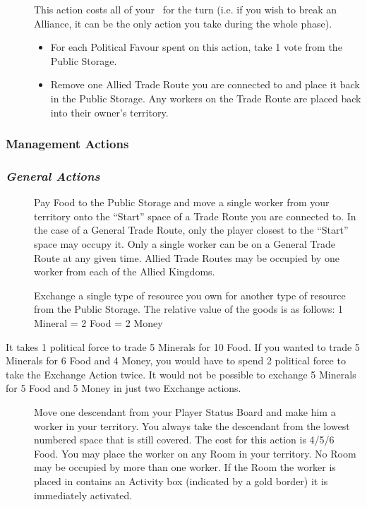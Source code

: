 \documentclass[10pt,twocolumn]{article}
\begin{document}
\begin{description}
\item[] This action costs all of your \polf\ for the turn (i.e. if you wish to break an Alliance, it can be the only action you take during the whole  phase).
\begin{itemize}
\item For each Political Favour spent on this action, take 1 vote from the Public Storage.
\item Remove one Allied Trade Route you are connected to and place it back in the Public Storage. Any workers on the Trade Route are placed back into their owner's territory.
\end{itemize}
\end{description}

\subsubsection{Management Actions}
\subsubsection*{\textit{General Actions}}
\begin{description}
\item[] Pay  Food to the Public Storage and move a single worker from your territory onto the ``Start'' space of a Trade Route you are connected to. In the case of a General Trade Route, only the player closest to the ``Start'' space may occupy it. Only a single worker can be on a General Trade Route at any given time. Allied Trade Routes may be occupied by one worker from each of the Allied Kingdoms.

\item[] Exchange a single type of resource you own for another type of resource from the Public Storage. The relative value of the goods is as follows: 1 Mineral = 2 Food = 2 Money
\end{description}
\begin{BoxExample}It takes 1 political force to trade 5 Minerals for 10 Food. If you wanted to trade 5 Minerals for 6 Food and 4 Money, you would have to spend 2 political force to take the Exchange Action twice. It would not be possible to exchange 5 Minerals for 5 Food and 5 Money in just two Exchange actions.\end{BoxExample}
\begin{description}
\item[] Move one descendant from your Player Status Board and make him a worker in your territory. You always take the descendant from the lowest numbered space that is still covered. The cost for this action is {4/5/6} Food. You may place the worker on any Room in your territory. No Room may be occupied by more than one worker. If the Room the worker is placed in contains an Activity box (indicated by a gold border) it is immediately activated.
\end{description}
\end{document}
